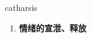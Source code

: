 
\begin{frame}
{\huge catharsis}
\begin{center}
\begin{enumerate}\Large
  \item \textbf{情绪的宣泄、释放}
\end{enumerate}
\end{center}
\end{frame}
